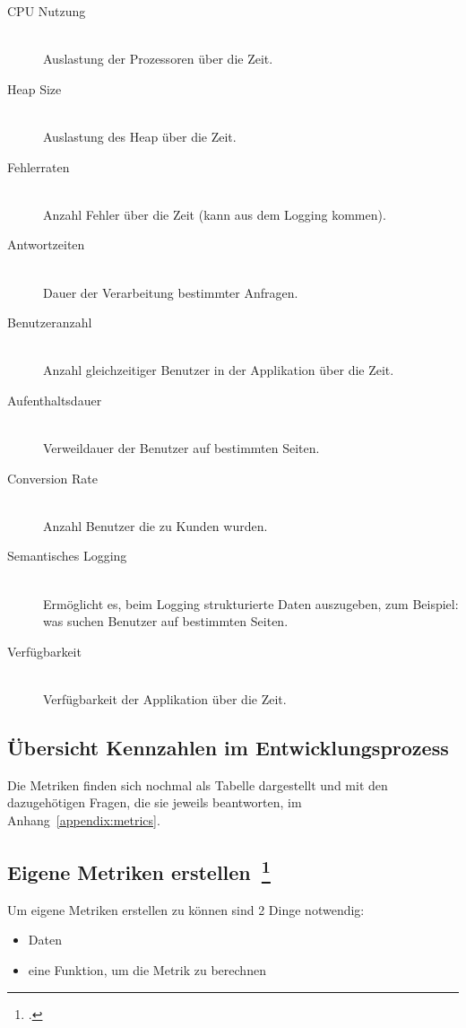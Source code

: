 \begin{description}
  \item[CPU Nutzung] \hfill \\ Auslastung der Prozessoren über die Zeit.
  \item[Heap Size] \hfill \\ Auslastung des Heap über die Zeit.
  \item[Fehlerraten] \hfill \\ Anzahl Fehler über die Zeit (kann aus dem Logging kommen).
  \item[Antwortzeiten] \hfill \\ Dauer der Verarbeitung bestimmter Anfragen.
  \item[Benutzeranzahl] \hfill \\ Anzahl gleichzeitiger Benutzer in der Applikation über die Zeit.
  \item[Aufenthaltsdauer] \hfill \\ Verweildauer der Benutzer auf bestimmten Seiten.
  \item[Conversion Rate] \hfill \\ Anzahl Benutzer die zu Kunden wurden.
  \item[Semantisches Logging] \hfill \\ Ermöglicht es, beim Logging strukturierte Daten auszugeben, zum Beispiel: was suchen Benutzer auf bestimmten Seiten.
  \item[Verfügbarkeit] \hfill \\ Verfügbarkeit der Applikation über die Zeit.
\end{description}

\subsection{Übersicht Kennzahlen im Entwicklungsprozess}

Die Metriken finden sich nochmal als Tabelle dargestellt und mit den dazugehötigen Fragen, die sie jeweils beantworten, im Anhang~\ref{appendix:metrics}.

\subsection[Eigene Metriken erstellen]{Eigene Metriken erstellen~\footcite[vgl.][S.127ff]{davis_agile_2015}}

Um eigene Metriken erstellen zu können sind 2 Dinge notwendig:
\begin{itemize}
  \item Daten
  \item eine Funktion, um die Metrik zu berechnen
\end{itemize}

